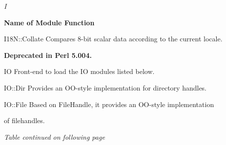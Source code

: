 \documentclass[a4paper,11pt]{book}
\begin{document}
\noindent \textit{I}

\noindent 

\noindent \textbf{Name of Module Function}

\noindent 

\noindent I18N::Collate Compares 8-bit scalar data according to the current locale.

\noindent 

\noindent \textbf{Deprecated in Perl 5.004.}

\noindent 

\noindent IO Front-end to load the IO modules listed below.

\noindent 

\noindent IO::Dir Provides an OO-style implementation for directory handles.

\noindent 

\noindent IO::File Based on FileHandle, it provides an OO-style implementation

\noindent of filehandles.

\noindent 

\noindent \textit{Table continued on following page}

\noindent 

\noindent 
\end{document}
